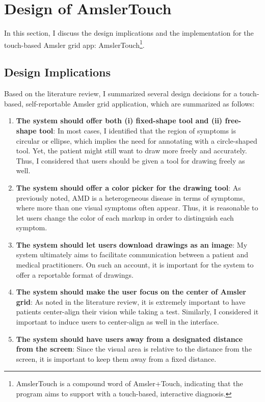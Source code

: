 
\section{Design of AmslerTouch}
In this section, I discuss the design implications and the implementation for the touch-based Amsler grid app: AmslerTouch\footnote{AmslerTouch is a compound word of Amsler+Touch, indicating that the program aims to support with a touch-based, interactive diagnosis.}.

\subsection{Design Implications}

Based on the literature review, I summarized several design decisions for a touch-based, self-reportable Amsler grid application, which are summarized as follows:

\begin{enumerate}
    \item \textbf{The system should offer both (i) fixed-shape tool and (ii) free-shape tool}: In most cases, I identified that the region of symptoms is circular or ellipse, which implies the need for annotating with a circle-shaped tool. Yet, the patient might still want to draw more freely and accurately. Thus, I considered that users should be given a tool for drawing freely as well.
    \item \textbf{The system should offer a color picker for the drawing tool}: As previously noted, AMD is a heterogeneous disease in terms of symptoms, where more than one visual symptoms often appear. Thus, it is reasonable to let users change the color of each markup in order to distinguish each symptom.
    \item \textbf{The system should let users download drawings as an image}: My system ultimately aims to facilitate communication between a patient and medical practitioners. On such an account, it is important for the system to offer a reportable format of drawings.
    \item \textbf{The system should make the user focus on the center of Amsler grid}: As noted in the literature review, it is extremely important to have patients center-align their vision while taking a test. Similarly, I considered it important to induce users to center-align as well in the interface.
    \item \textbf{The system should have users away from a designated distance from the screen}: Since the visual area is relative to the distance from the screen, it is important to keep them away from a fixed distance.
\end{enumerate}

